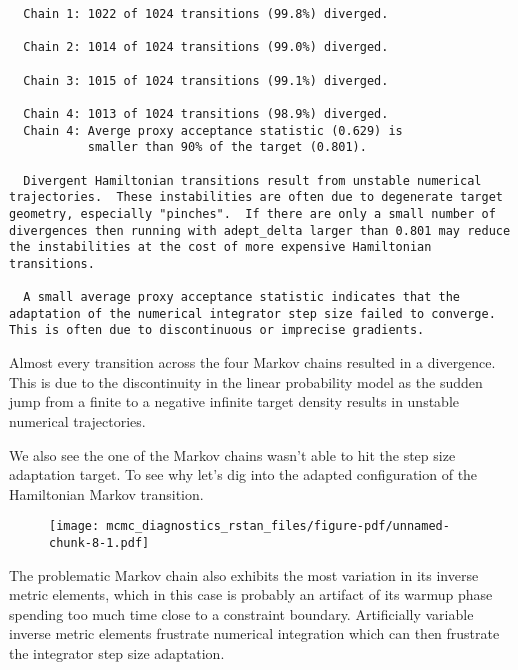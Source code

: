 \documentclass[
  letterpaper,
  DIV=11,
  numbers=noendperiod]{scrartcl}
\newenvironment{Shaded}{\begin{snugshade}}{\end{snugshade}}
\newcommand{\DecValTok}[1]{\textcolor[rgb]{0.68,0.00,0.00}{#1}}
\newcommand{\FunctionTok}[1]{\textcolor[rgb]{0.28,0.35,0.67}{#1}}
\newcommand{\NormalTok}[1]{\textcolor[rgb]{0.00,0.23,0.31}{#1}}
\newcommand{\SpecialCharTok}[1]{\textcolor[rgb]{0.37,0.37,0.37}{#1}}
\begin{document}
\begin{verbatim}
  Chain 1: 1022 of 1024 transitions (99.8%) diverged.

  Chain 2: 1014 of 1024 transitions (99.0%) diverged.

  Chain 3: 1015 of 1024 transitions (99.1%) diverged.

  Chain 4: 1013 of 1024 transitions (98.9%) diverged.
  Chain 4: Averge proxy acceptance statistic (0.629) is
           smaller than 90% of the target (0.801).

  Divergent Hamiltonian transitions result from unstable numerical
trajectories.  These instabilities are often due to degenerate target
geometry, especially "pinches".  If there are only a small number of
divergences then running with adept_delta larger than 0.801 may reduce
the instabilities at the cost of more expensive Hamiltonian
transitions.

  A small average proxy acceptance statistic indicates that the
adaptation of the numerical integrator step size failed to converge.
This is often due to discontinuous or imprecise gradients.
\end{verbatim}

Almost every transition across the four Markov chains resulted in a
divergence. This is due to the discontinuity in the linear probability
model as the sudden jump from a finite to a negative infinite target
density results in unstable numerical trajectories.

We also see the one of the Markov chains wasn't able to hit the step
size adaptation target. To see why let's dig into the adapted
configuration of the Hamiltonian Markov transition.

\begin{Shaded}
\end{Shaded}

\begin{figure}[H]

{\centering \texttt{[image: mcmc\_diagnostics\_rstan\_files/figure-pdf/unnamed-chunk-8-1.pdf]}

}

\end{figure}

The problematic Markov chain also exhibits the most variation in its
inverse metric elements, which in this case is probably an artifact of
its warmup phase spending too much time close to a constraint boundary.
Artificially variable inverse metric elements frustrate numerical
integration which can then frustrate the integrator step size
adaptation.
\end{document}
